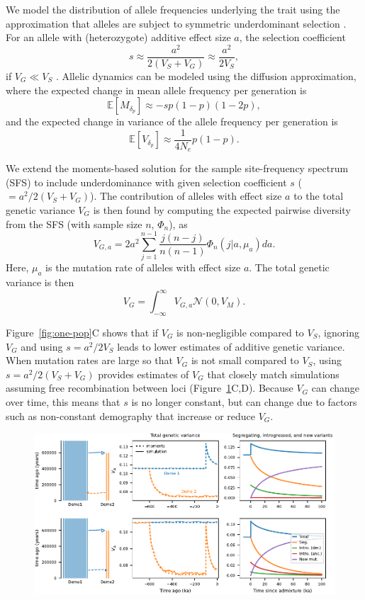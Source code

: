 \documentclass{article}
\newcommand{\E}{\mathbb{E}}
\begin{document}
We model the distribution of allele frequencies underlying the trait using
the approximation that alleles are subject to symmetric underdominant
selection \citep{robertson1956effect,keightley1988quantitative}.
For an allele with (heterozygote) additive effect size $a$,
the selection coefficient
\[s\approx \frac{a^2}{2(V_S + V_G)} \approx \frac{a^2}{2V_S},\]
if $V_G \ll V_S$ \citep[e.g.,][]{simons2018population}. Allelic dynamics can
be modeled using the diffusion approximation, where the expected change
in mean allele frequency per generation is
\[\E[M_{\delta_p}] \approx -s p(1-p)(1-2p),\]
and the expected change in variance of the allele frequency per generation is
\[\E[V_{\delta_p}] \approx \frac{1}{4N_e}p(1-p).\]

We extend the moments-based solution for the sample site-frequency spectrum
(SFS) \citep{jouganous2017} to include underdominance with given selection
coefficient $s$ (\(=a^2/2(V_S+V_G)\)). The contribution of alleles with effect
size $a$ to the total genetic variance $V_G$ is then found by computing the
expected pairwise diversity from the SFS (with sample size $n$, $\Phi_n$), as
\[V_{G,a} = 2a^2\sum_{j=1}^{n-1}\frac{j(n-j)}{n(n-1)}\Phi_n(j|a,\mu_a)da.\]
Here, $\mu_a$ is the mutation rate of alleles with effect size $a$. The total
genetic variance is then 
\[V_G=\int_{-\infty}^\infty V_{G,a}\mathcal{N}(0,V_M).\]

Figure~\ref{fig:one-pop}C shows that if $V_G$ is non-negligible compared to
$V_S$, ignoring $V_G$ and using $s=a^2/2V_S$ leads to lower estimates of
additive genetic variance. When mutation rates are large so that $V_G$ is not
small compared to $V_S$, using $s=a^2/2(V_S+V_G)$ provides estimates of $V_G$
that closely match simulations assuming free recombination between loci
(Figure~\ref{fig:toy-admixture}C,D). Because $V_G$ can change over time, this
means that $s$ is no longer constant, but can change due to factors such as
non-constant demography that increase or reduce $V_G$.

\begin{figure}[tb!]
    \centering
    \includegraphics{../figures/reciprocal_admixture.pdf}
    \caption{
        \textbf{}
    }
    \label{fig:toy-admixture}
\end{figure}
\end{document}
